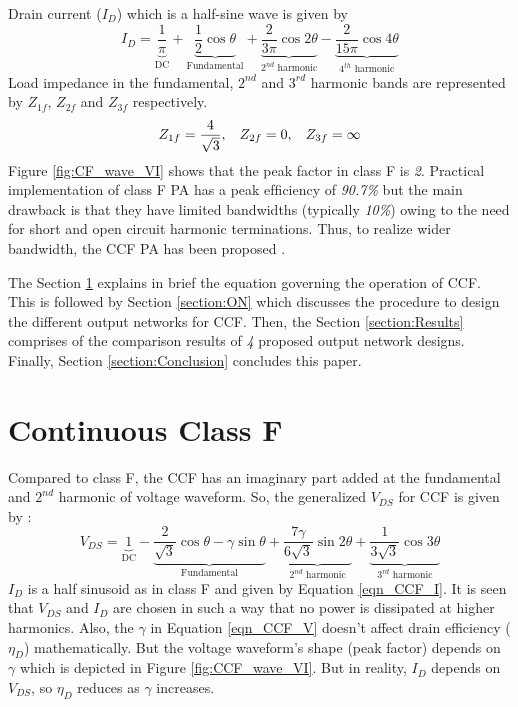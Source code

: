 \documentclass[conference]{IEEEtran}
\begin{document}
Drain current ($I_{D}$) which is a half-sine wave is given by
\begin{equation}
I_{D}=\underbrace{\frac{1}{\pi}}_{\text{DC}}+\underbrace{\frac{1}{2} \cos \theta}_{\text{Fundamental}}+\underbrace{\frac{2}{3 \pi} \cos 2 \theta}_{\text{$2^{nd}$ harmonic}}-\underbrace{\frac{2}{15 \pi} \cos 4 \theta}_{\text{$4^{th}$ harmonic}}
\label{eqn_CCF_I}
\end{equation}
Load impedance in the fundamental, $2^{nd}$ and $3^{rd}$  harmonic bands are represented by $Z_{1f}$, $Z_{2f}$ and $Z_{3f}$ respectively.
\begin{equation}
\begin{aligned}
Z_{1f}=\frac{4}{\sqrt{3}}, \hspace{3mm}
Z_{2f}=0, \hspace{3mm}
Z_{3f}=\infty
\end{aligned}
\label{eqn_CF}
\end{equation}
Figure \ref{fig:CF_wave_VI} shows that the peak factor in class F is \textit{2}. Practical implementation of class F PA has a peak efﬁciency of \textit{90.7\%} but the main drawback is that they have limited bandwidths (typically \textit{10\%}) owing to the need for short and open circuit harmonic terminations. Thus, to realize wider bandwidth, the CCF PA has been proposed \cite{CCF_reason}.

The Section \ref{section:CCF} explains in brief the equation governing the operation of CCF. This is followed by Section \ref{section:ON} which discusses the procedure to design the different output networks for CCF. Then, the Section \ref{section:Results} comprises of the comparison results of \textit{4} proposed output network designs. Finally, Section \ref{section:Conclusion} concludes this paper.   

\section{Continuous Class F}
\label{section:CCF}
\vspace{-0.05in}
Compared to class F, the CCF has an imaginary part added at the fundamental and $2^{nd}$ harmonic of voltage waveform. So, the generalized $V_{DS}$ for CCF is given by \cite{ECCF_Carrubba}:
\begin{equation}
V_{DS}=\underbrace{1}_{\text{DC}}-\underbrace{\frac{2}{\sqrt{3}} \cos \theta-\gamma \sin \theta}_{\text{Fundamental}}+\underbrace{\frac{7 \gamma}{6 \sqrt{3}} \sin 2 \theta}_{\text{$2^{nd}$ harmonic}}+\underbrace{\frac{1}{3 \sqrt{3}} \cos 3 \theta}_{\text{$3^{rd}$ harmonic}}
\label{eqn_CCF_V}
\end{equation}
$I_{D}$ is a half sinusoid as in class F and given by Equation \ref{eqn_CCF_I}. It is seen that $V_{DS}$ and $I_{D}$ are chosen in such a way that no power is dissipated at higher harmonics. Also, the $\gamma$ in Equation \ref{eqn_CCF_V} doesn’t affect drain efficiency ($\eta_D$) mathematically. But the voltage waveform’s shape (peak factor) depends on $\gamma$ which is depicted in Figure \ref{fig:CCF_wave_VI}. 
But in reality, $I_{D}$ depends on $V_{DS}$, so $\eta_D$ reduces as $\gamma$ increases.
\end{document}
